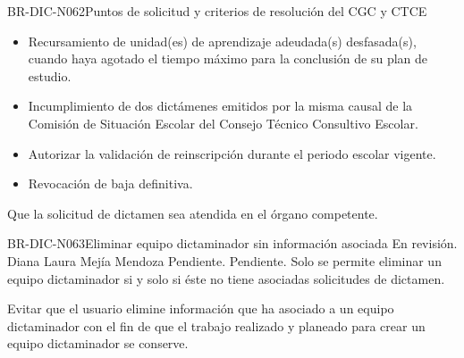 \begin{BusinessRule}{BR-DIC-N062}{Puntos de solicitud y criterios de resolución del CGC y CTCE}
\begin{itemize}
\begin{itemize}
				\item Recursamiento de unidad(es) de aprendizaje adeudada(s) desfasada(s), cuando haya agotado el tiempo máximo para la conclusión de su plan de estudio.
				\item Incumplimiento de dos dictámenes emitidos por la misma causal de la Comisión de Situación Escolar del Consejo Técnico Consultivo Escolar.
				\item Autorizar la validación de reinscripción durante el periodo escolar vigente.
				\item Revocación de baja definitiva.
			\end{itemize}
	\end{itemize}
	\BRItem[Motivación] Que la solicitud de dictamen sea atendida en el órgano competente.
\end{BusinessRule}

\begin{BusinessRule}{BR-DIC-N063}{Eliminar equipo dictaminador sin información asociada}
	{\bcCondition} %
	{\btTimer}     %
	{\blControlling}     %
	\BRItem[Estado] En revisión.
	 Diana Laura Mejía Mendoza
	 Pendiente.
	 Pendiente.
	\BRItem[Descripción] Solo se permite eliminar un equipo dictaminador si y solo si éste no tiene asociadas solicitudes de dictamen.
	\BRItem[Sentencia] \cdtEmpty
	


	\BRItem[Motivación] Evitar que el usuario elimine información que ha asociado a un equipo dictaminador con el fin de que el trabajo realizado y planeado para crear un equipo dictaminador se conserve.
\end{BusinessRule}


